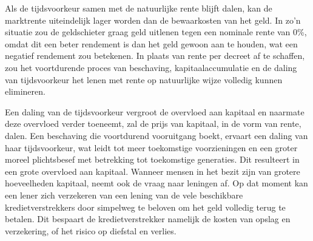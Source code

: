 \documentclass[
  a5paper,
  smalldemyvopaper,11pt,twoside,onecolumn,openright,extrafontsizes,
hidelinks]{memoir}
\begin{document}
Als de tijdsvoorkeur samen met de natuurlijke rente blijft dalen, kan de
marktrente uiteindelijk lager worden dan de bewaarkosten van het geld.
In zo'n situatie zou de geldschieter graag geld uitlenen tegen een
nominale rente van 0\%, omdat dit een beter rendement is dan het geld
gewoon aan te houden, wat een negatief rendement zou betekenen. In
plaats van rente per decreet af te schaffen, zou het voortdurende proces
van beschaving, kapitaalaccumulatie en de daling van tijdsvoorkeur het
lenen met rente op natuurlijke wijze volledig kunnen elimineren.

Een daling van de tijdsvoorkeur vergroot de overvloed aan kapitaal en
naarmate deze overvloed verder toeneemt, zal de prijs van kapitaal, in
de vorm van rente, dalen. Een beschaving die voortdurend vooruitgang
boekt, ervaart een daling van haar tijdsvoorkeur, wat leidt tot meer
toekomstige voorzieningen en een groter moreel plichtsbesef met
betrekking tot toekomstige generaties. Dit resulteert in een grote
overvloed aan kapitaal. Wanneer mensen in het bezit zijn van grotere
hoeveelheden kapitaal, neemt ook de vraag naar leningen af. Op dat
moment kan een lener zich verzekeren van een lening van de vele
beschikbare kredietverstrekkers door simpelweg te beloven om het geld
volledig terug te betalen. Dit bespaart de kredietverstrekker namelijk
de kosten van opslag en verzekering, of het risico op diefstal en
verlies.
\end{document}
